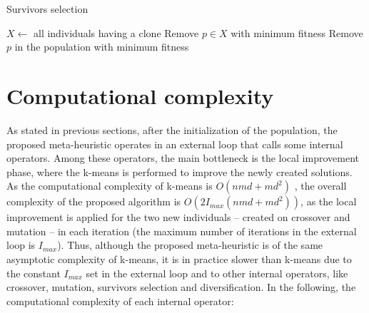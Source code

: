 \begin{algorithm}[H]
\caption{Survivors selection}
\label{survivors}
\begin{algorithmic}[1]
\STATE $X \leftarrow $ all individuals having a clone
\STATE Remove $p \in X$ with minimum fitness
\ELSE
\STATE Remove $p$ in the population with minimum fitness
\ENDIF
\ENDFOR
\end{algorithmic}
\end{algorithm}


\section{Computational complexity}
\label{sec:complexity-algo}
As stated in previous sections, after the initialization of the population, the proposed meta-heuristic operates in an external loop that calls some internal operators. Among these operators, the main bottleneck is the local improvement phase, where the k-means is performed to improve the newly created solutions. As the computational complexity of k-means is $O(nmd + md^2)$ \cite{Hamerly2010}, the overall complexity of the proposed algorithm is $O(2 I_{max} (nmd + md^2))$, as the local improvement is applied for the two new individuals -- created on crossover and mutation -- in each iteration (the maximum number of iterations in the external loop is $I_{max}$). Thus, although the proposed meta-heuristic is of the same asymptotic complexity of k-means, it is in practice slower than k-means due to the constant $I_{max}$ set in the external loop and to other internal operators, like crossover, mutation, survivors selection and diversification. In the following, the computational complexity of each internal operator:

